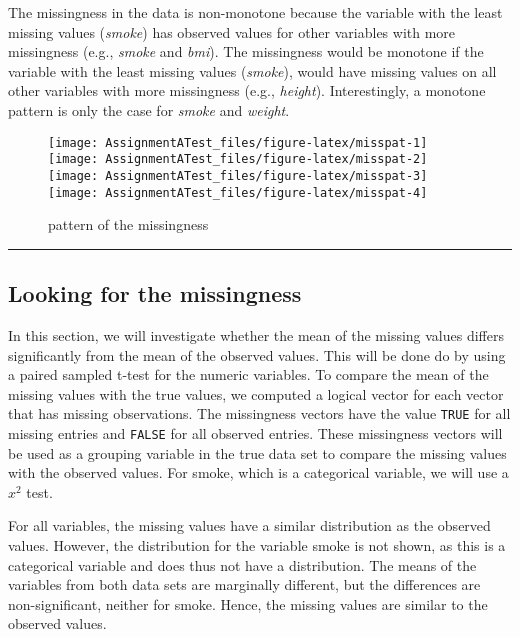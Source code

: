 \documentclass[
]{article}
\begin{document}
The missingness in the data is non-monotone because the variable with the least missing values (\emph{smoke}) has observed values for other variables with more missingness (e.g., \emph{smoke} and \emph{bmi}). The missingness would be monotone if the variable with the least missing values (\emph{smoke}), would have missing values on all other variables with more missingness (e.g., \emph{height}). Interestingly, a monotone pattern is only the case for \emph{smoke} and \emph{weight}.

\begin{figure}
\texttt{[image: AssignmentATest\_files/figure-latex/misspat-1]} \texttt{[image: AssignmentATest\_files/figure-latex/misspat-2]} \texttt{[image: AssignmentATest\_files/figure-latex/misspat-3]} \texttt{[image: AssignmentATest\_files/figure-latex/misspat-4]} \caption{pattern of the missingness}\label{fig:misspat}
\end{figure}

\begin{center}\rule{0.5\linewidth}{0.5pt}\end{center}

\hypertarget{looking-for-the-missingness}{%
\subsection{Looking for the missingness}\label{looking-for-the-missingness}}

In this section, we will investigate whether the mean of the missing values differs significantly from the mean of the observed values. This will be done do by using a paired sampled t-test for the numeric variables. To compare the mean of the missing values with the true values, we computed a logical vector for each vector that has missing observations. The missingness vectors have the value \texttt{TRUE} for all missing entries and \texttt{FALSE} for all observed entries. These missingness vectors will be used as a grouping variable in the true data set to compare the missing values with the observed values.
For smoke, which is a categorical variable, we will use a \(x^2\) test.

For all variables, the missing values have a similar distribution as the observed values. However, the distribution for the variable smoke is not shown, as this is a categorical variable and does thus not have a distribution. The means of the variables from both data sets are marginally different, but the differences are non-significant, neither for smoke. Hence, the missing values are similar to the observed values.
\end{document}
